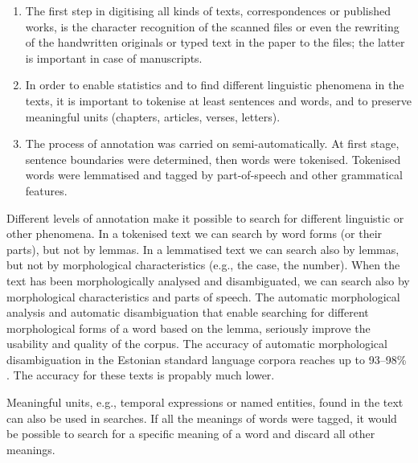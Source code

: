 \documentclass[runningheads]{llncs}
\begin{document}
\begin{enumerate}
\item The first step in digitising all kinds of texts, correspondences or published works, is the character recognition of the scanned files or even the rewriting of the handwritten originals or typed text in the paper to the files; the latter is important in case of manuscripts. 

\item In order to enable statistics and to find different linguistic phenomena in the texts, it is important to tokenise at least sentences and words, and to preserve meaningful units (chapters, articles, verses, letters). 

  \item The process of annotation was carried on semi-automatically. At first stage, sentence boundaries were determined, then words were tokenised. Tokenised words were lemmatised and tagged by part-of-speech and other grammatical features.

\end{enumerate}

Different levels of annotation make it possible to search for different linguistic or other phenomena. In a tokenised text we can search by word forms (or their parts), but not by lemmas. In a lemmatised text we can search also by lemmas, but not by morphological characteristics (e.g., the case, the number). When the text has been morphologically analysed and disambiguated, we can search also by morphological characteristics and parts of speech. The automatic morphological analysis and automatic disambiguation that enable searching for different morphological forms of a word based on the lemma, seriously improve the usability and quality of the corpus. The accuracy of automatic morphological disambiguation in the Estonian standard language corpora reaches up to 93--98\% \cite{veskisliba}.  The accuracy for these texts is propably much lower.


Meaningful units, e.g., temporal expressions or named entities, found in the text can also be used in searches. If all the meanings of words were tagged, it would be possible to search for a specific meaning of a word and discard all other meanings. 
\end{document}
